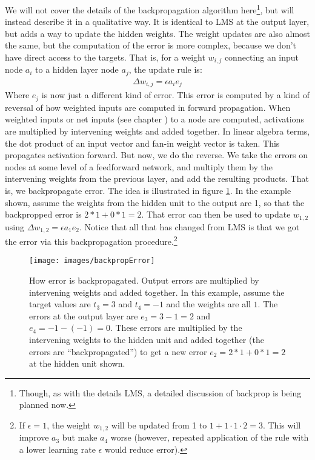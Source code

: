 We will not cover the details of the backpropagation algorithm here\footnote{Though, as with the details LMS, a detailed discussion of backprop is being planned now.}, but will instead describe it in a qualitative way. It is identical to LMS at the output layer, but adds a way to update the hidden weights. The weight updates are also almost the same, but the computation of the error is more complex, because we don't have direct access to the targets. That is, for a weight $w_{i,j}$ connecting an input node $a_i$ to a hidden layer node $a_j$, the update rule is:
\begin{eqnarray*}
\Delta w_{i,j}  =  \epsilon a_i e_j
\end{eqnarray*}
Where $e_j$ is now just a different kind of error. This error is computed by a kind of reversal of how weighted inputs are computed in forward propagation. When weighted inputs or net inputs (see chapter ) to a node are computed, activations are multiplied by intervening weights and added together. In linear algebra terms, the dot product of an input vector and fan-in weight vector is taken. This propagates activation forward. But now, we do the reverse. We take the errors on nodes at some level of a feedforward network, and multiply them by the intervening weights from the previous layer, and add the resulting products.  That is, we backpropagate error. The idea is illustrated in figure \ref{backprop_error}. In the example shown, assume the weights from the hidden unit to the output are 1, so that the backpropped error is $2 * 1 + 0 * 1 = 2$. That error can then be used to update $w_{1,2}$ using  $\Delta w_{1,2}  =  \epsilon a_1 e_2$. Notice that all that has changed from LMS is that we got the error via this backpropagation procedure.\footnote{If $\epsilon = 1$, the weight  $w_{1,2}$ will be updated from 1 to $1 + 1 \cdot 1 \cdot 2 = 3$. This will improve $a_3$ but make $a_4$ worse (however, repeated application of the rule with a lower learning rate $\epsilon$  would reduce error).}
\begin{figure}[h]
\centering
\texttt{[image: images/backpropError]}
\caption[Jeff Yoshimi.]{How error is backpropagated. Output errors are multiplied by intervening weights and added together. In this example, assume the target values are $t_3 = 3$ and $t_4 = -1$ and the weights are all $1$. The errors at the output layer are $e_3 = 3-1=2$ and $e_4 = -1 - (-1) =  0$.  These errors are multiplied by the intervening weights to the hidden unit and added together (the errors are ``backpropagated'') to get a new error $e_2 = 2 * 1 + 0 * 1 = 2$ at the hidden unit shown.}
\label{backprop_error}
\end{figure}

